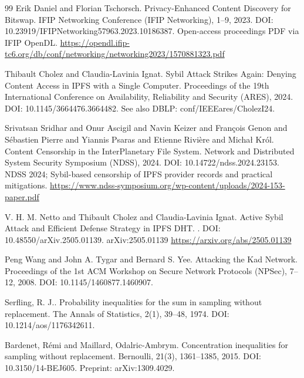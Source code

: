 \documentclass[11pt]{article}
\begin{document}
\begin{thebibliography}{99}
Erik Daniel and Florian Tschorsch.
\newblock Privacy-Enhanced Content Discovery for {Bitswap}.
\newblock IFIP Networking Conference (IFIP Networking), 1--9, 2023.
\newblock DOI: 10.23919/IFIPNetworking57963.2023.10186387.
\newblock Open-access proceedings PDF via IFIP OpenDL.
\newblock \url{https://opendl.ifip-tc6.org/db/conf/networking/networking2023/1570881323.pdf}

Thibault Cholez and Claudia-Lavinia Ignat.
\newblock Sybil Attack Strikes Again: Denying Content Access in {IPFS} with a Single Computer.
\newblock Proceedings of the 19th International Conference on Availability, Reliability and Security (ARES), 2024.
\newblock DOI: 10.1145/3664476.3664482.
\newblock See also DBLP: conf/IEEEares/CholezI24.

Srivatsan Sridhar and Onur Ascigil and Navin Keizer and Fran{\c{c}}ois Genon and S{\'e}bastien Pierre and Yiannis Psaras and Etienne Rivi{\`e}re and Micha{\l} Kr{\'o}l.
\newblock Content Censorship in the InterPlanetary File System.
\newblock Network and Distributed System Security Symposium (NDSS), 2024.
\newblock DOI: 10.14722/ndss.2024.23153.
\newblock NDSS 2024; Sybil-based censorship of IPFS provider records and practical mitigations.
\newblock \url{https://www.ndss-symposium.org/wp-content/uploads/2024-153-paper.pdf}

V. H. M. Netto and Thibault Cholez and Claudia-Lavinia Ignat.
\newblock Active Sybil Attack and Efficient Defense Strategy in {IPFS} {DHT}.
.
\newblock DOI: 10.48550/arXiv.2505.01139.
\newblock arXiv:2505.01139
\newblock \url{https://arxiv.org/abs/2505.01139}

Peng Wang and John A. Tygar and Bernard S. Yee.
\newblock Attacking the {Kad} Network.
\newblock Proceedings of the 1st ACM Workshop on Secure Network Protocols (NPSec), 7--12, 2008.
\newblock DOI: 10.1145/1460877.1460907.

Serfling, R. J..
\newblock Probability inequalities for the sum in sampling without replacement.
\newblock The Annals of Statistics, 2(1), 39--48, 1974.
\newblock DOI: 10.1214/aos/1176342611.

Bardenet, R{\'e}mi and Maillard, Odalric-Ambrym.
\newblock Concentration inequalities for sampling without replacement.
\newblock Bernoulli, 21(3), 1361--1385, 2015.
\newblock DOI: 10.3150/14-BEJ605.
\newblock Preprint: arXiv:1309.4029.


\end{thebibliography}
\end{document}
